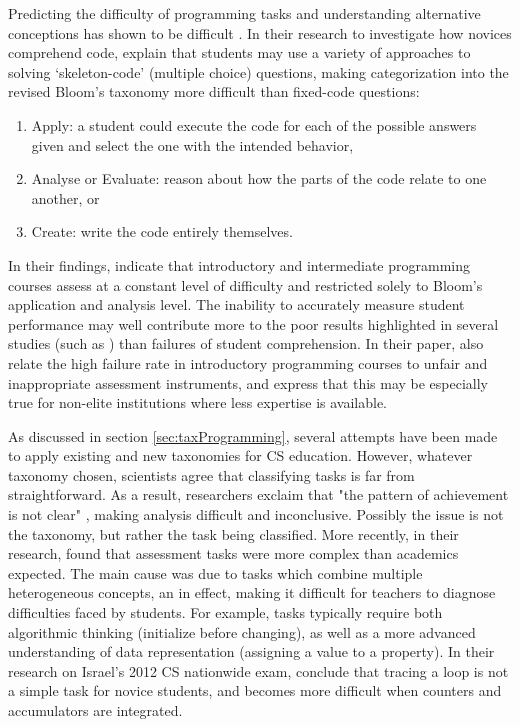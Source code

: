 Predicting the difficulty of programming tasks and understanding alternative conceptions has shown to be difficult \cite{Lonati2017Bebras}. In their research to investigate how novices comprehend code,  explain that students may use a variety of approaches to solving ‘skeleton-code’ (multiple choice) questions, making categorization into the revised Bloom’s taxonomy more difficult than fixed-code questions:
\begin{enumerate}
\item Apply: a student could execute the code for each of the possible answers given and select the one with the intended behavior,
\item Analyse or Evaluate: reason about how the parts of the code relate to one another, or
\item Create: write the code entirely themselves.
\end{enumerate}
In their findings,  indicate that introductory and intermediate programming courses assess at a constant level of difficulty and restricted solely to Bloom’s application and analysis level. The inability to accurately measure student performance may well contribute more to the poor results highlighted in several studies (such as ) than failures of student comprehension\cite{2010TewGuzdial}. In their paper,  also relate the high failure rate in introductory programming courses to unfair and inappropriate assessment instruments, and express that this may be especially true for non-elite institutions where less expertise is available.

As discussed in section \ref{sec:taxProgramming}, several attempts have been made to apply existing and new taxonomies for CS education. However, whatever taxonomy chosen, scientists agree that classifying tasks is far from straightforward. As a result, researchers exclaim that "the pattern of achievement is not clear" \cite{ZurBargury2013}, making analysis difficult and inconclusive. Possibly the issue is not the taxonomy, but rather the task being classified. More recently, in their research,  found that assessment tasks were more complex than academics expected. The main cause was due to tasks which combine multiple heterogeneous concepts, an in effect, making it difficult for teachers to diagnose difficulties faced by students. For example, tasks typically require both algorithmic thinking (initialize before changing), as well as a more advanced understanding of data representation (assigning a value to a property)\cite{Seiter2013}. In their research on Israel's 2012 CS nationwide exam,  conclude that tracing a loop is not a simple task for novice students, and becomes more difficult when counters and accumulators are integrated.

